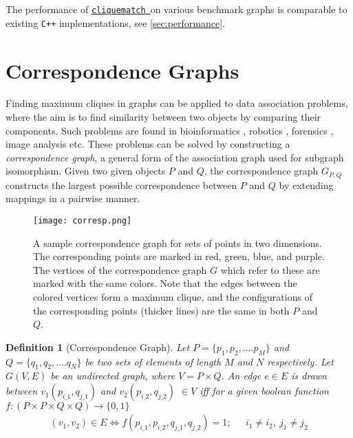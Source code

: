 \documentclass[12pt]{article}
\newcommand{\clqm}{\href{https://github.com/ahgamut/cliquematch}{\texttt{cliquematch}~}}
\newtheorem{definition}{Definition}
\begin{document}
The performance of \clqm on various benchmark graphs is comparable to existing
\texttt{C++} implementations, see  \autoref{sec:performance}.

\section{Correspondence Graphs}%
\label{sec:correspondence}
Finding maximum cliques in graphs can be applied to data association problems, where the
aim is to find similarity between two objects by comparing their components. Such
problems are found in bioinformatics \citep{gardiner1997}, robotics
\citep{pradalier2003}, forensics \citep{fingerprint1999}, image analysis
\citep{horaud1989} etc. These problems can be solved by constructing a
\emph{correspondence graph}, a general form of the association graph \citep{kozen1978clique}
used for subgraph isomorphism. Given two given objects $P$ and
$Q$, the correspondence graph $G_{P,Q}$ constructs the
largest possible correspondence between $P$ and
$Q$ by extending mappings in a pairwise manner.

\begin{figure}[htpb]
	\centering
	\hspace*{-1in}
	\texttt{[image: corresp.png]}
	\caption{A sample correspondence graph for sets of points in two dimensions. The corresponding
		points are marked in red, green, blue, and purple. The vertices of the correspondence graph $G$ which refer to
		these are marked with the same colors. Note that the edges between the colored vertices
		form a maximum clique, and the configurations of the corresponding points (thicker lines) are the same in both
		$P$ and $Q$.}
	\label{fig:corrgraph}
\end{figure}

\begin{definition}[Correspondence Graph]
	Let $P = \{p_1, p_2, .... p_M\} $ and $Q = \{q_1, q_2, .... q_N\}$ be two
	sets of elements of length $M$ and $N$
	respectively. Let $G (V,E)$ be an undirected graph, where
	$V = P \times Q$.  An edge $e \in E$ is drawn between
	$v_1(p_{i\_1}, q_{j\_1})$ and $v_2(p_{i\_2}, q_{j\_2})$ $\in V$ iff for a given
	boolean function $f : (P \times P \times Q \times Q) \rightarrow \{0,1\} $
	\begin{align}
		\label{eq:eq1}
		(v_1, v_2) \in E \iff
		f(p_{i\_1}, p_{i\_2}, q_{j\_1}, q_{j\_2}) = 1;\ ~~ &
		i_1 \ne i_2,\  j_1 \ne j_2
	\end{align}
\end{definition}
\end{document}
